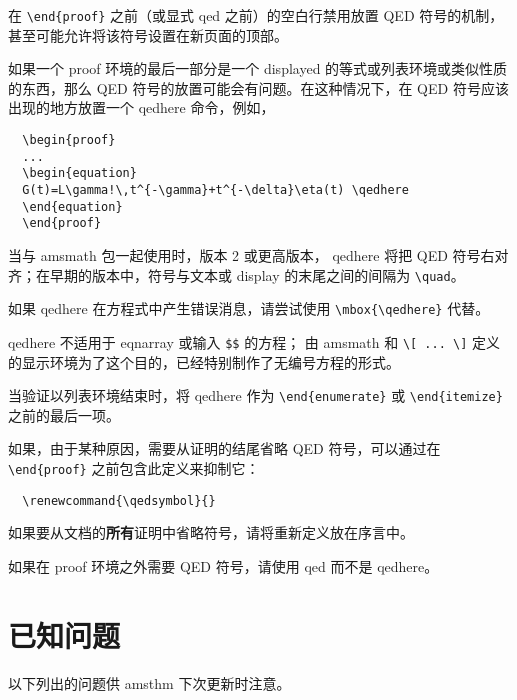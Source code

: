 \documentclass[11pt,twoside]{article}
\renewcommand{\emph}[1]{\textbf{#1}}
\newcommand{\ntt}{%
  \fontfamily\ttdefault \fontseries\mddefault \fontshape\updefault
  \selectfont
}
\DeclareRobustCommand{\cn}[1]{{\ntt\bslchar#1}}
\DeclareRobustCommand{\pkg}[1]{{\ntt#1}}
\DeclareRobustCommand{\env}[1]{{\ntt#1}}
\providecommand{\qedsymbol}{\leavevmode
  \hbox to.77778em{%
  \hfil\vrule
  \vbox to.675em{\hrule width.6em\vfil\hrule}%
  \vrule\hfil}}
\begin{document}
在 \verb+\end{proof}+ 之前（或显式 \cn{qed} 之前）的空白行禁用放置 QED 符号的机制，甚至可能允许将该符号设置在新页面的顶部。

如果一个 \env{proof} 环境的最后一部分是一个 displayed 的等式或列表环境或类似性质的东西，那么 QED 符号的放置可能会有问题。在这种情况下，在 QED 符号应该出现的地方放置一个 \cn{qedhere} 命令，例如，
\begin{verbatim}
  \begin{proof}
  ...
  \begin{equation}
  G(t)=L\gamma!\,t^{-\gamma}+t^{-\delta}\eta(t) \qedhere
  \end{equation}
  \end{proof}
\end{verbatim}
当与 \pkg{amsmath} 包一起使用时，版本 2 或更高版本，\cn{qedhere} 将把 QED 符号右对齐；在早期的版本中，符号与文本或 display 的末尾之间的间隔为 \verb+\quad+。

如果 \cn{qedhere} 在方程式中产生错误消息，请尝试使用 \verb+\mbox{\qedhere}+ 代替。

\cn{qedhere} 不适用于 \env{eqnarray} 或输入 \verb+$$+ 的方程；
由 \pkg{amsmath} 和 \verb+\[ ... \]+ 定义的显示环境为了这个目的，已经特别制作了无编号方程的形式。

当验证以列表环境结束时，将 \cn{qedhere} 作为 \verb+\end{enumerate}+ 或 \verb+\end{itemize}+ 之前的最后一项。

如果，由于某种原因，需要从证明的结尾省略 QED 符号，可以通过在 \verb+\end{proof}+ 之前包含此定义来抑制它：
\begin{verbatim}
  \renewcommand{\qedsymbol}{}
\end{verbatim}
如果要从文档的\emph{所有}证明中省略符号，请将重新定义放在序言中。

如果在 \env{proof} 环境之外需要 QED 符号，请使用 \cn{qed} 而不是 \cn{qedhere}。



\section{已知问题}

以下列出的问题供 \pkg{amsthm} 下次更新时注意。
\end{document}
